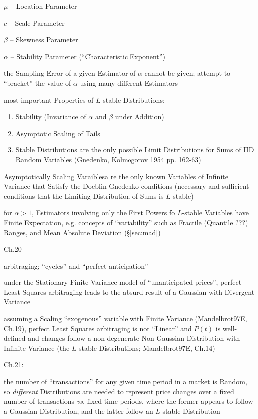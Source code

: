 $\mu$ -- Location Parameter

$c$ -- Scale Parameter

$\beta$ -- Skewness Parameter

$\alpha$ -- Stability Parameter (``Characteristic Exponent'')

the Sampling Error of a given Estimator of $\alpha$ cannot be given; attempt to
``bracket'' the value of $\alpha$ using many different Estimators

most important Properties of $L$-stable Distributions:
\begin{enumerate}
  \item Stability (Invariance of $\alpha$ and $\beta$ under Addition)
  \item Asymptotic Scaling of Tails
  \item Stable Distributions are the only possible Limit Distributions for Sums
    of IID Random Variables (Gnedenko, Kolmogorov 1954 pp. 162-63)
\end{enumerate}

Asymptotically Scaling Varaiblesa re the only known Variables of Infinite
Variance that Satisfy the Doeblin-Gnedenko conditions (necessary and sufficient
conditions that the Limiting Distribution of Sums is $L$-stable)

for $\alpha > 1$, Estimators involving only the First Powers fo $L$-stable
Variables have Finite Expectation, e.g. concepts of ``variability'' such as
Fractile (Quantile ???) Ranges, and Mean Absolute Deviation (\S\ref{sec:mad})

Ch.20

arbitraging; ``cycles'' and ``perfect anticipation''

under the Stationary Finite Variance model of ``unanticipated prices'', perfect
Least Squares arbitraging leads to the absurd result of a Gaussian with
Divergent Variance

assuming a Scaling ``exogenous'' variable with Finite Variance (Mandelbrot97E,
Ch.19), perfect Least Squares arbitraging is not ``Linear'' and $P(t)$ is
well-defined and changes follow a non-degenerate Non-Gaussian Distribution with
Infinite Variance (the $L$-stable Distributions; Mandelbrot97E, Ch.14)

Ch.21:

the number of ``transactions'' for any given time period in a market is Random,
so \emph{different} Distributions are needed to represent price changes over a
fixed number of transactions \emph{vs.} fixed time periods, where the former
appears to follow a Gaussian Distribution, and the latter follow an $L$-stable
Distribution


